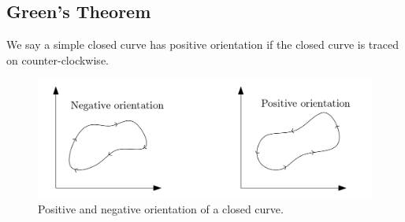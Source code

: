 \documentclass[
	12pt,
	]{article}
\theoremstyle{custom}
\theoremstyle{custom}
\theoremstyle{custom}
\theoremstyle{custom}
\theoremstyle{custom}
\theoremstyle{definition}
\theoremstyle{example}
\theoremstyle{note}
\theoremstyle{remark}
\theoremstyle{example}
\numberwithin{equation}{subsection}
\begin{document}
  			\subsection{Green's Theorem}
  				We say a simple closed curve has positive orientation if the closed curve is traced on counter-clockwise.
  				
  				\begin{figure}[H]
  					\centering 
  					\includegraphics[width=0.9\linewidth]{MATH314_Notes_Triple_Integral_Example6_Figure.png}
  					\captionsetup{margin=1cm, justification=raggedright}\caption{Positive and negative orientation of a closed curve.}
  				\end{figure}
  				
\end{document}
